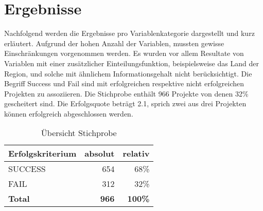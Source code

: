 \chapter{Ergebnisse}\label{sec: Ergeb}
Nachfolgend werden die Ergebnisse pro Variablenkategorie dargestellt und kurz erläutert. Aufgrund der hohen Anzahl der Variablen, mussten gewisse Einschränkungen vorgenommen werden. Es wurden vor allem Resultate von Variablen mit einer zusätzlicher Einteilungsfunktion, beispielsweise das Land der Region, und solche mit ähnlichem Informationsgehalt nicht berücksichtigt. Die Begriff Success und Fail sind mit erfolgreichen respektive nicht erfolgreichen Projekten zu assoziieren.
\newline\newline
Die Stichprobe enthält 966 Projekte von denen 32\% gescheitert sind. Die Erfolgsquote beträgt 2.1, sprich zwei aus drei Projekten können erfolgreich abgeschlossen werden. 
\begin{table}[H]
	\centering
	\caption{Übersicht Stichprobe}
	\begin{tabular} {l|r|r}
		\toprule
		\textbf{Erfolgskriterium} & \textbf{absolut} & \textbf{relativ} \\
		\midrule
		SUCCESS & 654 & 68\% \\
		FAIL & 312 & 32\% \\
		\bottomrule
		\textbf{Total} & \textbf{966} & \textbf{100\%} \\
	\end{tabular}
\end{table}
